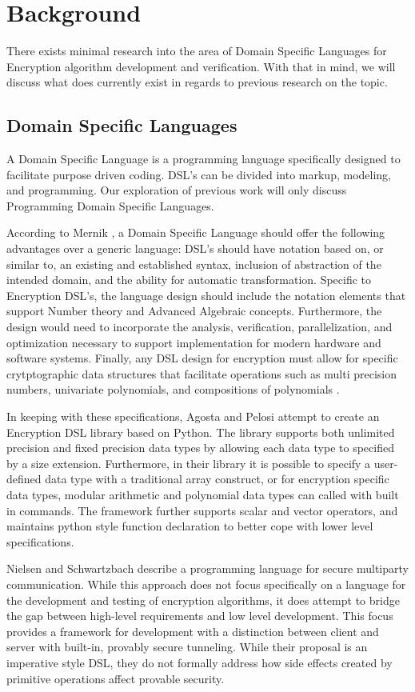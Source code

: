 \section{Background}
There exists minimal research into the area of Domain Specific Languages for Encryption algorithm development and verification. With that in mind, we will discuss what does currently exist in regards to previous research on the topic.

\subsection{Domain Specific Languages}
 A Domain Specific Language is a programming language specifically designed to facilitate purpose driven coding. DSL's can be divided into markup, modeling, and programming. Our exploration of previous work will only discuss Programming Domain Specific Languages. 

According to Mernik \cite{Mernik}, a Domain Specific Language should offer the following advantages over a generic language: DSL's should have notation based on, or similar to, an existing and established syntax, inclusion of abstraction of the intended domain, and the ability for automatic transformation. Specific to Encryption DSL's, the language design should include the notation elements that support Number theory and Advanced Algebraic concepts. Furthermore, the design would need to incorporate the analysis, verification, parallelization, and optimization necessary to support implementation for modern hardware and software systems. Finally, any DSL design for encryption must allow for specific crytptographic data structures that facilitate operations such as multi precision numbers, univariate polynomials, and compositions of polynomials \cite{Agosta}.

In keeping with these specifications, Agosta and Pelosi \cite{Agosta} attempt to create an  Encryption DSL library based on Python. The library supports both unlimited precision and fixed precision data types by allowing each data type to specified by a size extension. Furthermore, in their library it is possible to specify a user-defined data type with a traditional array construct, or for encryption specific data types, modular arithmetic and polynomial data types can called with built in commands. The framework further supports scalar and vector operators, and maintains python style function declaration to better cope with lower level specifications.

Nielsen and Schwartzbach \cite{Nielson} describe a programming language for secure multiparty communication. While this approach does not focus specifically on a language for the development and testing  of encryption algorithms, it does attempt to bridge the gap between high-level requirements and low level development. This focus provides a framework for development with a distinction between client and server with built-in, provably secure tunneling.  While their proposal is an imperative style DSL, they do not formally address how side effects created by primitive operations affect provable security.

